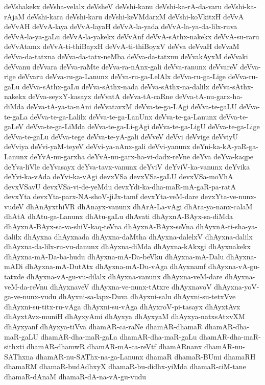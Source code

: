 {deVshakekx
deVsha-velalx
deVsheV
deVshi-kanu
deVshi-ka-rA-da-varu
deVshi-ka-rAjaM
deVshi-kara
deVshi-karu
deVshi-keVMdarxM
deVshi-koVkitxH
deVvA
deVvAH
deVvA-laya
deVvA-layaH
deVvA-la-yada
deVvA-la-ya-da-lilx-ruva
deVvA-la-ya-gaLu
deVvA-la-yakekx
deVvAnf
deVvA-sAthx-nakekx
deVvA-su-raru
deVvAtamx
deVvA-ti-thiBayxH
deVvA-ti-thiBoyxV
deVva
deVvaH
deVvaM
deVva-da-tatxna
deVva-da-tatx-neMba
deVva-da-tatxnu
deVvakAyxM
deVvaki
deVvanu
deVvara
deVva-raMte
deVva-ra-nAnx-gali
deVva-ranunx
deVvareV
deVva-rige
deVvaru
deVva-ru-ga-Lanunx
deVva-ru-ga-LelAlx
deVva-ru-ga-Lige
deVva-ru-gaLu
deVva-sAthx-gaLu
deVva-sAthx-nada
deVva-sAthx-na-dalilx
deVva-sAthx-nakekx
deVva-seyxY-kasayx
deVvatA
deVva-tA-caRne
deVva-tA-nu-garx-ha-diMda
deVva-tA-ya-ta-nAni
deVvatavxM
deVva-te-ga-LAgi
deVva-te-gaLU
deVva-te-gaLa
deVva-te-ga-Lalilx
deVva-te-ga-LanUnx
deVva-te-ga-Lanunx
deVva-te-gaLeV
deVva-te-ga-LiMda
deVva-te-ga-Li-gAgi
deVva-te-ga-LigU
deVva-te-ga-Lige
deVva-te-gaLu
deVva-tege
deVva-te-yA-gali
deVveV
deVvi
deVvige
deVviyU
deVviya
deVvi-yaM-teyeV
deVvi-ya-nAnx-gali
deVvi-yanunx
deYni-ka-kA-yaR-ga-Lanunx
deYvA-nu-garxha
deYvA-nu-garx-ha-vi-dadx-reVne
deYva
deYva-kaqpe
deYva-liVle
deYvasayx
deYva-tavx-vanunx
deYviV
deYviV-ka-vanunx
deYvika
deYvi-ka-vAda
deYvi-ka-vAgi
devxVSa
devxVSa-gaLU
devxVSa-moVhA
devxVSavU
devxVSa-vi-de-yeMdu
devxYdi-ka-dha-maR-mA-gaR-pa-ratA
devxYta
devxYta-parx-NA-shoV-jiJx-tamf
devxYta-veM-dare
devxYta-ve-nunx-vudeV
dhAnAyxthiVR
dhAnayx-vanunx
dhArA-La-vAgi
dhAra-ya-nanx-calaM
dhAtA
dhAtu-ga-Lanunx
dhAtu-gaLu
dhAvati
dhAyxnA-BAyx-sa-diMda
dhAyxnA-BAyx-sa-va-shiV-kaq-teVna
dhAyxnA-BAyx-seVna
dhAyxnA-ti-sha-ya-dalilx
dhAyxna
dhAyxnada
dhAyxna-daMtha
dhAyxna-dalelxV
dhAyxna-dalilx
dhAyxna-da-lilx-ru-vu-danunx
dhAyxna-diMda
dhAyxna-kAkxgi
dhAyxnakekx
dhAyxna-mA-Da-ba-hudu
dhAyxna-mA-Da-beVku
dhAyxna-mA-Dalu
dhAyxna-mADi
dhAyxna-mA-DutAtx
dhAyxna-mA-Du-vAga
dhAyxnamf
dhAyxna-vA-gu-tatxde
dhAyxna-vA-gu-vu-dilalx
dhAyxna-vanunx
dhAyxna-veM-dare
dhAyxna-veM-da-reVnu
dhAyxnaveV
dhAyxna-ve-nunx-tAtxre
dhAyxnavoV
dhAyxna-yoV-ga-ve-nunx-vudu
dhAyxni-sa-lapx-Duva
dhAyxni-salu
dhAyxni-su-tetxVve
dhAyxni-su-titx-ru-vAga
dhAyxni-su-vAga
dhAyxroV-pi-tasayx
dhAyxtAvx
dhAyxtAvx-muniH
dhAyxyAmi
dhAyxya
dhAyxyaM
dhAyxya-natxsAtxvXM
dhAyxyanf
dhAyxya-tiVva
dhamAR-ca-raNe
dhamAR-dhamaR
dhamAR-dha-maR-gaLU
dhamAR-dha-maR-gaLa
dhamAR-dha-maR-gaLu
dhamAR-dha-maR-sithxti
dhamAR-dhamwR
dhamAR-mA-ca-reVtf
dhamARnanx
dhamAR-nu-SAThxna
dhamAR-nu-SAThx-na-ga-Lanunx
dhamaR
dhamaR-BUmi
dhamaRH
dhamaRM
dhamaR-budAdhxyX
dhamaR-bu-didhx-yiMda
dhamaR-ciM-tane
dhamaR-dAnaM
dhamaR-dA-na-vA-gu-vudu
}
